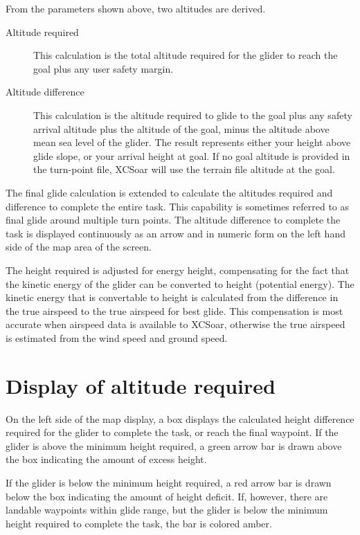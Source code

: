 \documentclass[a4paper,12pt]{refrep}
\begin{document}
From the parameters shown above, two altitudes are derived.
\begin{description}
\item[Altitude required]
This calculation is the total altitude required for the glider to
reach the goal plus any user safety margin. 
\item[Altitude difference]
This calculation is the altitude required to glide to the goal plus
any safety arrival altitude plus the altitude of the goal, minus the
altitude above mean sea level of the glider.  The result represents
either your height above glide slope, or your arrival height at goal.
If no goal altitude is provided in the turn-point file, XCSoar will use
the terrain file altitude at the goal.
\end{description}

The final glide calculation is extended to calculate the altitudes
required and difference to complete the entire task.  This capability
is sometimes referred to as final glide around multiple turn points.
The altitude difference to complete the task is displayed continuously
as an arrow and in numeric form on the left hand side of the map area
of the screen.

The height required is adjusted for energy height, compensating for
the fact that the kinetic energy of the glider can be converted to
height (potential energy).  The kinetic energy that is convertable to
height is calculated from the difference in the true airspeed to the
true airspeed for best glide.  This compensation is most accurate when
airspeed data is available to XCSoar, otherwise the true airspeed is
estimated from the wind speed and ground speed.

\section{Display of altitude required}

On the left side of the map display, a box displays the calculated
height difference required for the glider to complete the task, or
reach the final waypoint.  If the glider is above the minimum height
required, a green arrow bar is drawn above the box indicating the
amount of excess height.

If the glider is below the minimum height required, a red arrow bar is
drawn below the box indicating the amount of height deficit.  If,
however, there are landable waypoints within glide range, but the
glider is below the minimum height required to complete the task, the
bar is colored amber.
\end{document}
